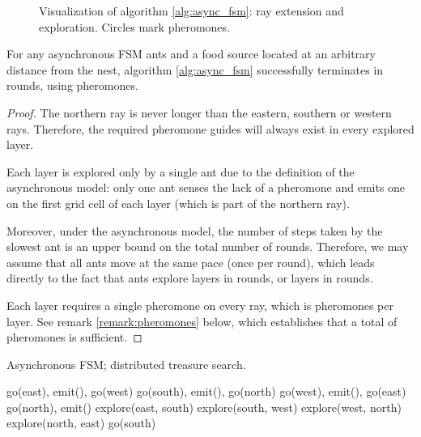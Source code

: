 \begin{figure}[!ht]
\begin{tikzpicture}[scale=0.70]
\end{tikzpicture}
\caption{Visualization of algorithm \ref{alg:async_fsm}: ray extension and exploration. Circles mark pheromones.}
\label{fig:async_fsm}
\end{figure}

\begin{theorem}
For any  asynchronous FSM ants and a food
 source located at an arbitrary distance  from the nest, 
algorithm \ref{alg:async_fsm} successfully terminates in 
rounds, using  pheromones.
\end{theorem}

\begin{proof}
The northern ray is never longer than the eastern, southern or western rays. Therefore,
the required pheromone guides will always exist in every explored layer.

Each layer is explored only by a single ant due to the definition of the asynchronous
 model: only one ant senses the lack of a pheromone and emits one
 on the first grid cell of each layer (which is part of the northern ray). 

Moreover, under the asynchronous model, the number of steps taken by the slowest ant
 is an upper bound on the total number of
 rounds. Therefore, we may assume that all ants move at the same pace (once per round),
which leads directly to the fact that  ants explore  layers in  rounds,
or  layers in  rounds.

Each layer requires a single pheromone on every ray, which is 
pheromones per layer. See remark \ref{remark:pheromones} below, which establishes that
a total of  pheromones is sufficient.
\end{proof}

\begin{algorithm}
  \caption{Asynchronous FSM; distributed treasure search.}
  \label{alg:async_fsm}
  \begin{algorithmic}[1]
      \While{}
        \State go(east), emit(), go(west) 
        \State go(south), emit(), go(north) 
        \State go(west), emit(), go(east)
        \State go(north), emit() 
        \State explore(east, south) 
        \State explore(south, west)
        \State explore(west, north)
        \State explore(north, east) 
        \State go(south)
      \EndWhile
  \end{algorithmic}
\end{algorithm}

